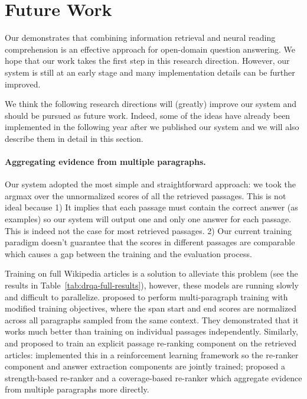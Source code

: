 
\section{Future Work}
\label{sec:openqa-future}

Our  demonstrates that combining information retrieval and neural reading comprehension is an effective approach for open-domain question answering. We hope that our work takes the first step in this research direction. However, our system is still at an early stage and many implementation details can be further improved.

We think the following research directions will (greatly) improve our  system and should be pursued as future work. Indeed, some of the ideas have already been implemented in the following year after we published our  system and we will also describe them in detail in this section.

\paragraph{Aggregating evidence from multiple paragraphs.} Our system adopted the most simple and straightforward approach: we took the argmax over the unnormalized scores of all the retrieved passages. This is not ideal because 1) It implies that each passage must contain the correct answer (as  examples) so our system will output one and only one answer for each passage. This is indeed not the case for most retrieved passages. 2) Our current training paradigm doesn't guarantee that the scores in different passages are comparable which causes a gap between the training and the evaluation process.

Training on full Wikipedia articles is a solution to alleviate this problem (see the  results in Table~\ref{tab:drqa-full-results}), however, these models are running slowly and difficult to parallelize.  proposed to perform multi-paragraph training with modified training objectives, where the span start and end scores are normalized across all paragraphs sampled from the same context. They demonstrated that it works much better than training on individual passages independently. Similarly,  and  proposed to train an explicit passage re-ranking component on the retrieved articles:  implemented this in a reinforcement learning framework so the re-ranker component and answer extraction components are jointly trained;  proposed a strength-based re-ranker and a coverage-based re-ranker which aggregate evidence from multiple paragraphs more directly.


